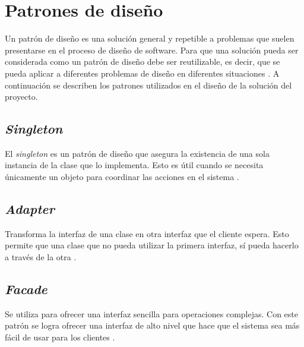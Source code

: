 \section{Patrones de diseño} \label{sect:Patrones de diseno}

Un patrón de diseño es una solución general y repetible a problemas que suelen presentarse en el proceso de diseño de software. Para que una solución pueda ser considerada como un patrón de diseño debe ser reutilizable, es decir, que se pueda aplicar a diferentes problemas de diseño en diferentes situaciones \cite{DSP0}. A continuación se describen los patrones utilizados en el diseño de la solución del proyecto.


\subsection{\textit{Singleton}}

El \textit{singleton} es un patrón de diseño que asegura la existencia de una sola instancia de la clase que lo implementa. Esto es útil cuando se necesita únicamente un objeto para coordinar las acciones en el sistema \cite{DSP1}.

\subsection{\textit{Adapter}}

Transforma la interfaz de una clase en otra interfaz que el cliente espera. Esto permite que una clase que no pueda utilizar la primera interfaz, sí pueda hacerlo a través de la otra \cite{DSP1}.

\subsection{\textit{Facade}}

Se utiliza para ofrecer una interfaz sencilla para operaciones complejas. Con este patrón se logra ofrecer una interfaz de alto nivel que hace que el sistema sea más fácil de usar para los clientes \cite{DSP1}.

